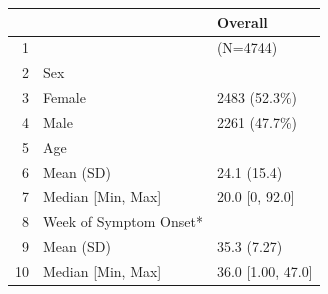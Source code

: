 \begin{table}[ht]
\centering
\begin{tabular}{rll}
  \hline
 &   & Overall \\ 
  \hline
1 &  & (N=4744) \\ 
  2 & Sex &  \\ 
  3 &   Female & 2483 (52.3\%) \\ 
  4 &   Male & 2261 (47.7\%) \\ 
  5 & Age &  \\ 
  6 &   Mean (SD) & 24.1 (15.4) \\ 
  7 &   Median [Min, Max] & 20.0 [0, 92.0] \\ 
  8 & Week of Symptom Onset* &  \\ 
  9 &   Mean (SD) & 35.3 (7.27) \\ 
  10 &   Median [Min, Max] & 36.0 [1.00, 47.0] \\ 
   \hline
\end{tabular}
\end{table}
